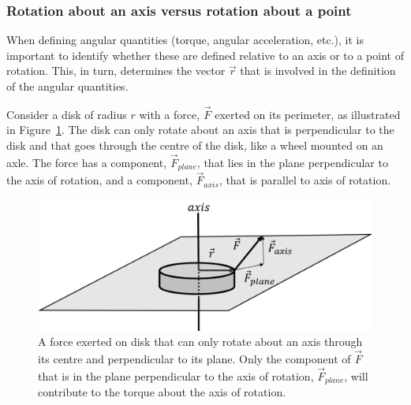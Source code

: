 \subsubsection{Rotation about an axis versus rotation about a point}

When defining angular quantities (torque, angular acceleration, etc.), it is important to identify whether these are defined relative to an axis or to a point of rotation. This, in turn, determines the vector $\vec r$ that is involved in the definition of the angular quantities.

Consider a disk of radius $r$ with a force, $\vec F$ exerted on its perimeter, as illustrated in Figure~\ref{fig:rotationaldynamics:fplane}. The disk can only rotate about an axis that is perpendicular to the disk and that goes through the centre of the disk, like a wheel mounted on an axle. The force has a component, $\vec F_{plane}$, that lies in the plane perpendicular to the axis of rotation, and a component, $\vec F_{axis}$, that is parallel to axis of rotation.

\begin{figure}[!htbp]
\centering
\includegraphics[width=0.625\linewidth]{files/fplane-de1bde47b195b9a91df8497fea637c1f.png}
\caption[]{A force exerted on disk that can only rotate about an axis through its centre and perpendicular to its plane. Only the component of $\vec F$ that is in the plane perpendicular to the axis of rotation, $\vec F_{plane}$, will contribute to the torque about the axis of rotation.}
\label{fig:rotationaldynamics:fplane}
\end{figure}

